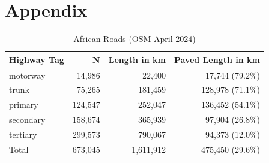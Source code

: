\documentclass[a4paper]{article}
\begin{document}


 
\newpage
\section*{Appendix}
\setcounter{table}{0}
\renewcommand{\thetable}{A\arabic{table}}
\setcounter{figure}{0}
\renewcommand{\thefigure}{A\arabic{figure}}



\begin{table}[H] %
\centering
\caption{\label{tab:OSM_Roads}African Roads (OSM April 2024)}
\vspace{2mm}
\begin{tabular}{lrrr}
  \toprule
Highway Tag & N & Length in km & Paved Length in km \\ 
  \midrule
motorway & 14,986 & 22,400 & 17,744 (79.2\%) \\ 
  trunk & 75,265 & 181,459 & 128,978 (71.1\%) \\ 
  primary & 124,547 & 252,047 & 136,452 (54.1\%) \\ 
  secondary & 158,674 & 365,939 & 97,904 (26.8\%) \\ 
  tertiary & 299,573 & 790,067 & 94,373 (12.0\%) \\ \midrule
  Total & 673,045 & 1,611,912 & 475,450 (29.6\%) \\
   \bottomrule
\end{tabular}
\end{table}
\end{document}
